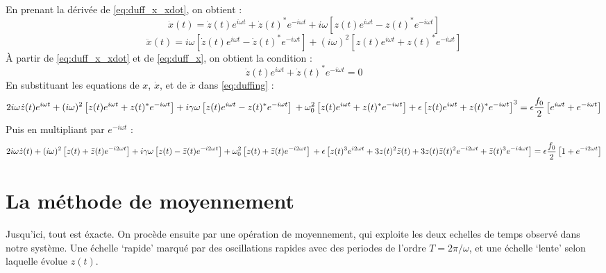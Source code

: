 En prenant la dérivée de \eqref{eq:duff_x_xdot}, on obtient :
\begin{equation}
    \dot{x}(t) = \dot{z}(t)e^{i\omega t} + \dot{z}(t)^* e^{-i\omega t} + i\omega \left[ z(t)e^{i\omega t} - z(t)^* e^{-i\omega t} \right]
    \label{eq:duff_x}
\end{equation}
\begin{equation}
    \ddot{x}(t) = i\omega \left[ \dot{z}(t)e^{i\omega t} - \dot{z}(t)^* e^{-i\omega t} \right] + (i\omega)^2 \left[ z(t)e^{i\omega t} + z(t)^* e^{-i\omega t} \right]
\end{equation}
À partir de \eqref{eq:duff_x_xdot} et de \eqref{eq:duff_x}, on obtient la condition :
\begin{equation}
    \dot{z}(t)e^{i\omega t} + \dot{z}(t)^* e^{-i\omega t} = 0
\end{equation}
%
En substituant les equations de $x$, $\dot{x}$, et de $\ddot{x}$ dans \eqref{eq:duffing} :
%
\begin{dmath}
    2i\omega \dot{z}(t)e^{i\omega t} + (i\omega)^2 \left[ z(t)e^{i\omega t} + z(t)^* e^{-i\omega t} \right]
    + i\gamma\omega \left[ z(t)e^{i\omega t} - z(t)^* e^{-i\omega t} \right] \\
    + \omega_0^2 \left[ z(t)e^{i\omega t} + z(t)^* e^{-i\omega t} \right]
    + \epsilon \left[ z(t)e^{i\omega t} + z(t)^* e^{-i\omega t} \right]^3 = \epsilon \frac{f_0}{2}\left[ e^{i\omega t} + e^{-i\omega t} \right]
\end{dmath}
Puis en multipliant par $e^{-i\omega t}$ :
\begin{dmath}
    2i\omega \dot{z}(t) + (i\omega)^2 \left[ z(t) + \bar{z}(t) e^{-i 2 \omega t} \right]
    + i\gamma\omega \left[ z(t) - \bar{z}(t) e^{-i 2 \omega t} \right]
    + \omega_0^2 \left[ z(t) + \bar{z}(t) e^{-i 2 \omega t} \right] \\
    + \epsilon \left[ z(t)^3 e^{i 2 \omega t} + 3 z(t)^2 \bar{z}(t) + 3z(t)\bar{z}(t)^2 e^{-i2\omega t} + \bar{z}(t)^3 e^{-i4 \omega t} \right]
    = \epsilon \frac{f_0}{2}\left[ 1 + e^{-i 2 \omega t} \right]
    \label{eq:duff_pre_av}
\end{dmath}
%
\section{La méthode de moyennement}
%
Jusqu'ici, tout est éxacte. On procède ensuite par une opération de moyennement, qui exploite les deux echelles de temps observé dans notre système. 
Une échelle `rapide' marqué par des oscillations rapides avec des periodes de l'ordre $T = 2\pi / \omega$, 
et une échelle `lente' selon laquelle évolue $z(t)$. 


